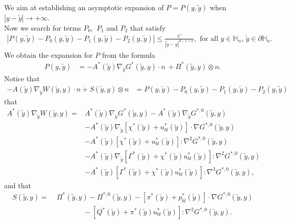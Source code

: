 \documentclass[11pt, reqno]{amsart}
\theoremstyle{definition}
\theoremstyle{remark}
\numberwithin{equation}{section}
\begin{document}
	
	\\
	\noindent We aim at establishing an asymptotic expansion of $P= P(y,\tilde{y})$  when $|y-\tilde{y}| \longrightarrow +\infty$.\\
	\noindent Now we search for terms $P_0,$  $P_1$  and $P_2$ that satisfy
	\begin{align*}
		\left| P(y,\tilde{y})-P_0(y,\tilde{y})- P_1(y,\tilde{y})-P_2(y,\tilde{y}) \right| \leq \frac{C}{|\tilde{y}-y|^{d-1+\kappa}} , \mbox{ for all }  y\in \mathbb{H}_n, \, \tilde{y}\in \partial \mathbb{H}_n.
	\end{align*}
	We obtain the expansion for $P$ from the formula
	\begin{align*}
		P(y,\tilde{y})&=  -A^*(\tilde{y}) \nabla_{\tilde{y}} G^*(\tilde{y},y)\cdot n\, + \Pi^*(\tilde{y},y)\otimes n.
	\end{align*}
	Notice that
	\begin{align*}
		-A(\tilde{y}) \nabla_{\!\tilde{y}} W (\tilde{y},y)\cdot n+     S(\tilde{y},y) \otimes n&=	P(y,\tilde{y})-P_0(y,\tilde{y})- P_1(y,\tilde{y})-P_2(y,\tilde{y})
	\end{align*}
that
	\begin{align*}
		A^*(\tilde{y}) \nabla_{\!\tilde{y}} W (\tilde{y},y)
		=& A^*(\tilde{y}) \nabla_{\!\tilde{y}}G^* \left(\tilde{y},y \right)-A^*(\tilde{y}) \nabla_{\!\tilde{y}}G^{*,0} \left(\tilde{y},y \right)\\
		&- A^*(\tilde{y}) \nabla_{\!\tilde{y}}\left[\chi^* \left(\tilde{y} \right)+ u_{bl}^*\left(\tilde{y} \right)\right]\cdot \nabla G^{*,0}\left(\tilde{y},y\right)\\
		&- A^*(\tilde{y}) \left[\chi^* \left(\tilde{y} \right)+ u_{bl}^*\left(\tilde{y} \right)\right]: \nabla^2G^{*,0}\left(\tilde{y},y\right)\\
		&- A^*(\tilde{y}) \nabla_{\!\tilde{y}}\left[\Gamma^* \left(\tilde{y}\right)+ \chi^*\left(\tilde{y} \right) u_{bl}^*\left(\tilde{y} \right)\right]: \nabla^2 G^{*,0}\left(\tilde{y},y \right) \\
		&- A^*(\tilde{y})\left[\Gamma^* \left(\tilde{y}\right)+ \chi^*\left(\tilde{y} \right) u_{bl}^*\left(\tilde{y} \right)\right]: \nabla^3 G^{*,0}\left(\tilde{y},y \right),
	\end{align*}
		and that
	\begin{align*}
		S(\tilde{y},y)	=&\;\Pi^*( \tilde{y}, y)- \Pi^{*,0}( \tilde{y}, y)- [\pi^*(\tilde{y})+p_{bl}^*(\tilde{y})] \cdot\nabla G^{*,0}(\tilde{y}, y) \\
		&\qquad\qquad - [Q^*(\tilde{y})+\pi^* (\tilde{y})u_{bl}^*(\tilde{y})]:\nabla^2 G^{*,0}(\tilde{y}, y).
	\end{align*}
	
\end{document}
